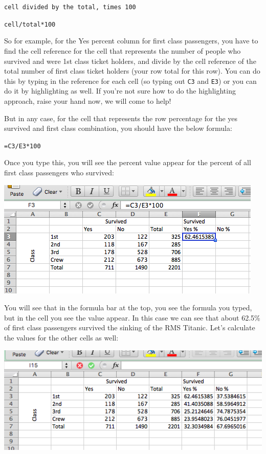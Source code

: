 \documentclass[]{book}
\theoremstyle{definition}
\theoremstyle{definition}
\theoremstyle{definition}
\theoremstyle{remark}
\begin{document}
\texttt{cell\ divided\ by\ the\ total,\ times\ 100}

\texttt{cell/total*100}

So for example, for the Yes percent column for first class passengers,
you have to find the cell reference for the cell that represents the
number of people who survived and were 1st class ticket holders, and
divide by the cell reference of the total number of first class ticket
holders (your row total for this row). You can do this by typing in the
reference for each cell (so typing out \texttt{C3} and \texttt{E3}) or
you can do it by highlighting as well. If you're not sure how to do the
highlighting approach, raise your hand now, we will come to help!

But in any case, for the cell that represents the row percentage for the
yes survived and first class combination, you should have the below
formula:

\texttt{=C3/E3*100}

Once you type this, you will see the percent value appear for the
percent of all first class passengers who survived:

\includegraphics{imgs/perc_surv_value.png}

You will see that in the formula bar at the top, you see the formula you
typed, but in the cell you see the value appear. In this case we can see
that about 62.5\% of first class passengers survived the sinking of the
RMS Titanic. Let's calculate the values for the other cells as well:

\includegraphics{imgs/all_row_perc.png}
\end{document}
